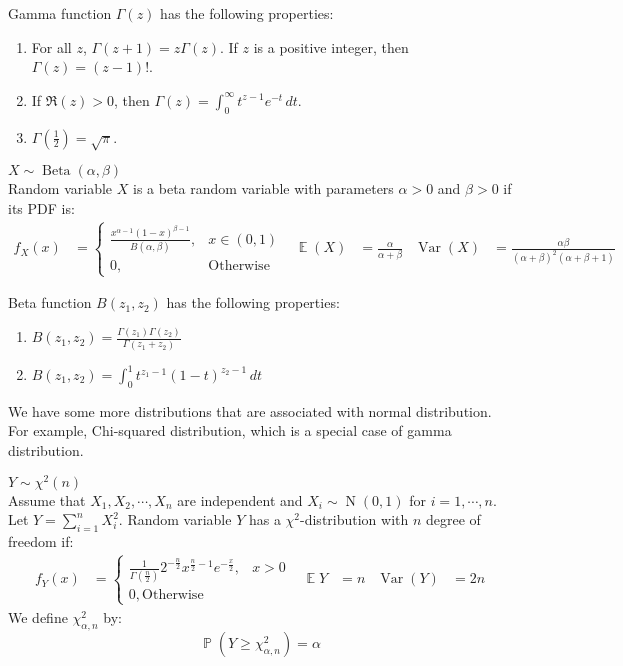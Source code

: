 \documentclass{huhtakm-template-book-v2}
\DeclareMathOperator{\prob}{\mathbb{P}}
\DeclareMathOperator{\E}{\mathbb{E}}
\DeclareMathOperator{\Var}{Var}
\DeclareMathOperator{\N}{N}
\DeclareMathOperator{\Bet}{Beta}
\begin{document}
\begin{rem}
	Gamma function $\Gamma(z)$ has the following properties:
	\begin{enumerate}
		\item For all $z$, $\Gamma(z+1)=z\Gamma(z)$. If $z$ is a positive integer, then $\Gamma(z)=(z-1)!$.
		\item If $\Re(z)>0$, then $\Gamma(z)=\int_{0}^{\infty}t^{z-1}e^{-t}\,dt$.
		\item $\Gamma(\frac{1}{2})=\sqrt{\pi}$.
	\end{enumerate}
\end{rem}
\begin{eg} $X\sim\Bet(\alpha,\beta)$\\
	Random variable $X$ is a beta random variable with parameters $\alpha>0$ and $\beta>0$ if its PDF is: 
	\begin{align*}
		f_{X}(x)&=\begin{cases}
			\frac{x^{\alpha-1}(1-x)^{\beta-1}}{B(\alpha,\beta)}, &x\in(0,1)\\
			0, &\text{Otherwise}
		\end{cases} & \E(X)&=\frac{\alpha}{\alpha+\beta} & \Var(X)&=\frac{\alpha\beta}{(\alpha+\beta)^{2}(\alpha+\beta+1)}
	\end{align*}
\end{eg}
\begin{rem}
	Beta function $B(z_{1},z_{2})$ has the following properties:
	\begin{enumerate}
		\item $B(z_{1},z_{2})=\frac{\Gamma(z_{1})\Gamma(z_{2})}{\Gamma(z_{1}+z_{2})}$
		\item $B(z_{1},z_{2})=\int_{0}^{1}t^{z_{1}-1}(1-t)^{z_{2}-1}\,dt$
	\end{enumerate}
\end{rem}
We have some more distributions that are associated with normal distribution. For example, Chi-squared distribution, which is a special case of gamma distribution.
\begin{eg} $Y\sim\chi^{2}(n)$\\
	Assume that $X_{1},X_{2},\cdots,X_{n}$ are independent and $X_{i}\sim\N(0,1)$ for $i=1,\cdots,n$. Let $Y=\sum_{i=1}^{n}X_{i}^{2}$. Random variable $Y$ has a $\chi^{2}$-distribution with $n$ degree of freedom if:
	\begin{align*}
		f_{Y}(x)&=\begin{cases}
			\frac{1}{\Gamma(\frac{n}{2})}2^{-\frac{n}{2}}x^{\frac{n}{2}-1}e^{-\frac{x}{2}}, &x>0\\
			0, \text{Otherwise}
		\end{cases} & \E{Y}&=n & \Var(Y)&=2n
	\end{align*}
	We define $\chi^{2}_{\alpha,n}$ by:
	\begin{equation*}
		\prob(Y\geq\chi^{2}_{\alpha,n})=\alpha
	\end{equation*}
\end{eg} 
\end{document}
